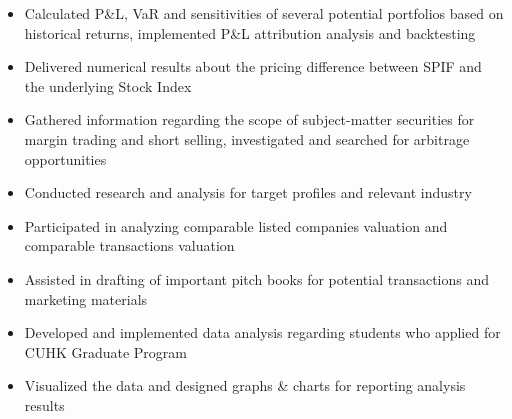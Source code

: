 \documentclass[10pt]{article}
\begin{document}
    \begin{itemize}
        \item Calculated P\&L, VaR and sensitivities of several potential portfolios based on historical returns, implemented P\&L attribution analysis and backtesting
        \item Delivered numerical results about the pricing difference between SPIF and the underlying Stock Index
        \item Gathered information regarding the scope of subject-matter securities for margin trading and short selling, investigated and searched for arbitrage opportunities
    \end{itemize}
    \begin{itemize}
        \item Conducted research and analysis for target profiles and relevant industry
        \item Participated in analyzing comparable listed companies valuation and comparable transactions valuation
        \item Assisted in drafting of important pitch books for potential transactions and marketing materials
    \end{itemize}
    \begin{itemize}
        \item Developed and implemented data analysis regarding students who applied for CUHK Graduate Program
        \item Visualized the data and designed graphs \& charts for reporting analysis results
    \end{itemize}
\end{document}
